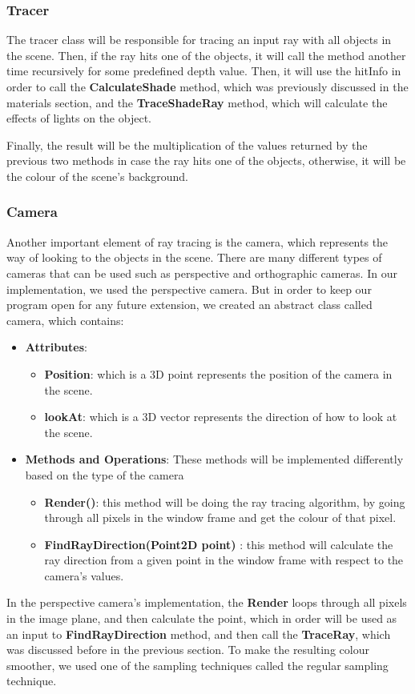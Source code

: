 \documentclass[a4paper]{report}
\begin{document}
	\subsubsection{Tracer}
	The tracer class will be responsible for tracing an input ray with all objects in the scene. Then, if the ray hits one of the objects, it will call the method another time recursively for some predefined depth value. Then, it will use the hitInfo in order to call the \textbf{CalculateShade} method, which was previously discussed in the materials section, and the \textbf{TraceShadeRay} method, which will calculate the effects of lights on the object.\\  
	\par Finally, the result will be the multiplication of the values returned by the previous two methods in case the ray hits one of the objects, otherwise, it will be the colour of the scene's background.
	\subsubsection{Camera}
	\label{sssec:cam}Another important element of ray tracing is the camera, which represents the way of looking to the objects in the scene. There are many different types of cameras that can be used such as perspective and orthographic cameras. In our implementation, we used the perspective camera. But in order to keep our program open for any future extension, we created an abstract class called camera, which contains:
	\begin{itemize}
		\item \textbf{Attributes}:
		\begin{itemize} 
			\item \textbf{Position}: which is a 3D point represents the position of the camera in the scene.
			\item \textbf{lookAt}: which is a 3D vector represents the direction of how to look at the scene.
		\end{itemize}
		\item \textbf{Methods and Operations}: These methods will be implemented differently based on the type of the camera
		\begin{itemize} 
			\item \textbf{Render()}: this method will be doing the ray tracing algorithm, by going through all pixels in the window frame and get the colour of that pixel.
			\item \textbf{FindRayDirection(Point2D point)} : this method will calculate the ray direction from a given point in the window frame with respect to the camera's values.
		\end{itemize}
	\end{itemize}
	\par In the perspective camera's implementation, the \textbf{Render} loops through all pixels in the image plane,  and then calculate the point, which in order will be used as an input to \textbf{FindRayDirection} method, and then call the \textbf{TraceRay}, which was discussed before in the previous section. To make the resulting colour smoother, we used one of the sampling techniques called the regular sampling technique.
\end{document}

